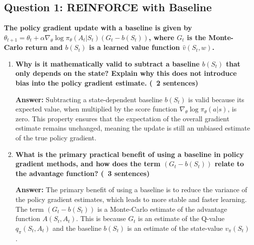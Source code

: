 \documentclass[12pt]{article}
\begin{document}
\subsection{Question 1: REINFORCE with Baseline}
\textbf{The policy gradient update with a baseline is given by $\theta_{t+1} = \theta_t + \alpha \nabla_\theta \log \pi_\theta(A_t|S_t) (G_t - b(S_t))$, where $G_t$ is the Monte-Carlo return and $b(S_t)$ is a learned value function $\hat{v}(S_t, w)$.}
\begin{enumerate}
    \item \textbf{Why is it mathematically valid to subtract a baseline $b(S_t)$ that only depends on the state? Explain why this does not introduce bias into the policy gradient estimate. (~2 sentences)}

    \textbf{Answer:} Subtracting a state-dependent baseline $b(S_t)$ is valid because its expected value, when multiplied by the score function $\nabla_\theta \log \pi_\theta(a|s)$, is zero. This property ensures that the expectation of the overall gradient estimate remains unchanged, meaning the update is still an unbiased estimate of the true policy gradient.
    \item \textbf{What is the primary practical benefit of using a baseline in policy gradient methods, and how does the term $(G_t - b(S_t))$ relate to the advantage function? (~3 sentences)}

    \textbf{Answer:} The primary benefit of using a baseline is to reduce the variance of the policy gradient estimates, which leads to more stable and faster learning. The term $(G_t - b(S_t))$ is a Monte-Carlo estimate of the advantage function $A(S_t, A_t)$. This is because $G_t$ is an estimate of the Q-value $q_\pi(S_t, A_t)$ and the baseline $b(S_t)$ is an estimate of the state-value $v_\pi(S_t)$.
\end{enumerate}
\end{document}
